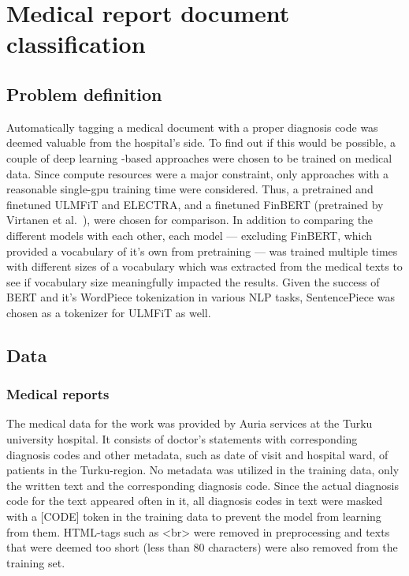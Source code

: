\chapter{Medical report document classification} \label{Medical report document classification}

\section{Problem definition} \label{Problem definition}

Automatically tagging a medical document with a proper diagnosis code was deemed valuable from the hospital's side.
To find out if this would be possible, a couple of deep learning -based approaches were chosen to be trained on medical data.
Since compute resources were a major constraint, only approaches with a reasonable single-gpu training time were considered.
Thus, a pretrained and finetuned ULMFiT and ELECTRA, and a finetuned FinBERT (pretrained by Virtanen et al.~\cite{virtanen2019}), were chosen for comparison.
In addition to comparing the different models with each other, each model --- excluding FinBERT, which provided a vocabulary of it's own from pretraining --- was trained multiple times with different sizes of a vocabulary which was extracted from the medical texts to see if vocabulary size meaningfully impacted the results.
Given the success of BERT and it's WordPiece tokenization in various NLP tasks, SentencePiece was chosen as a tokenizer for ULMFiT as well.

\section{Data} \label{Data}
\subsection{Medical reports}\label{Medical reports}
The medical data for the work was provided by Auria services at the Turku university hospital.
It consists of doctor's statements with corresponding diagnosis codes and other metadata, such as date of visit and hospital ward, of patients in the Turku-region.
No metadata was utilized in the training data, only the written text and the corresponding diagnosis code.
Since the actual diagnosis code for the text appeared often in it, all diagnosis codes in text were masked with a [CODE] token in the training data to prevent the model from learning from them.
HTML-tags such as <br> were removed in preprocessing and texts that were deemed too short (less than 80 characters) were also removed from the training set.

